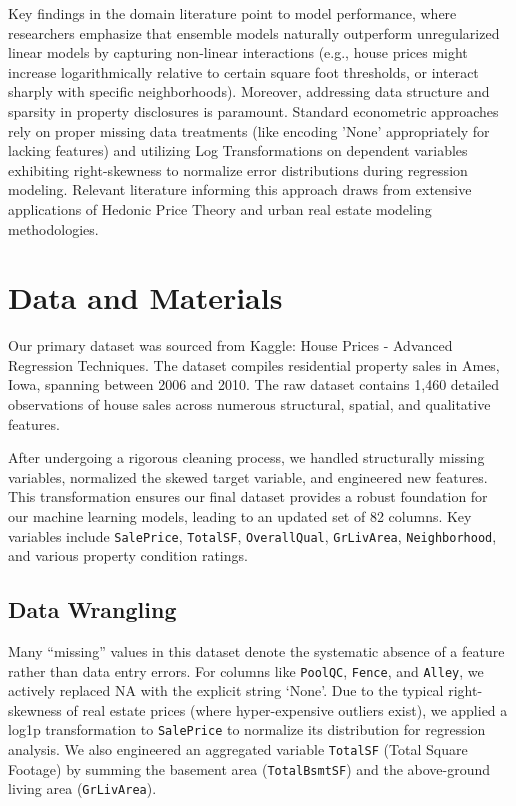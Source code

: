 \documentclass[eng]{ajceam-class}
\begin{document}
Key findings in the domain literature point to model performance, where researchers emphasize that ensemble models naturally outperform unregularized linear models by capturing non-linear interactions (e.g., house prices might increase logarithmically relative to certain square foot thresholds, or interact sharply with specific neighborhoods). Moreover, addressing data structure and sparsity in property disclosures is paramount. Standard econometric approaches rely on proper missing data treatments (like encoding 'None' appropriately for lacking features) and utilizing Log Transformations on dependent variables exhibiting right-skewness to normalize error distributions during regression modeling. Relevant literature informing this approach draws from extensive applications of Hedonic Price Theory and urban real estate modeling methodologies.

\section{Data and Materials}

Our primary dataset was sourced from Kaggle: House Prices - Advanced Regression Techniques. The dataset compiles residential property sales in Ames, Iowa, spanning between 2006 and 2010. The raw dataset contains 1,460 detailed observations of house sales across numerous structural, spatial, and qualitative features.

After undergoing a rigorous cleaning process, we handled structurally missing variables, normalized the skewed target variable, and engineered new features. This transformation ensures our final dataset provides a robust foundation for our machine learning models, leading to an updated set of 82 columns. Key variables include \texttt{SalePrice}, \texttt{TotalSF}, \texttt{OverallQual}, \texttt{GrLivArea}, \texttt{Neighborhood}, and various property condition ratings.

\subsection{Data Wrangling}

Many ``missing'' values in this dataset denote the systematic absence of a feature rather than data entry errors. For columns like \texttt{PoolQC}, \texttt{Fence}, and \texttt{Alley}, we actively replaced NA with the explicit string `None'. Due to the typical right-skewness of real estate prices (where hyper-expensive outliers exist), we applied a log1p transformation to \texttt{SalePrice} to normalize its distribution for regression analysis. We also engineered an aggregated variable \texttt{TotalSF} (Total Square Footage) by summing the basement area (\texttt{TotalBsmtSF}) and the above-ground living area (\texttt{GrLivArea}). 
\end{document}
